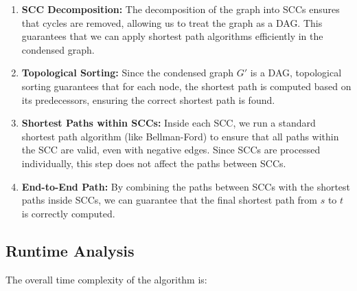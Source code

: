 \documentclass[11pt]{article}
\begin{document}
\begin{enumerate}
    \item \textbf{SCC Decomposition:} The decomposition of the graph into SCCs ensures that cycles are removed, allowing us to treat the graph as a DAG. This guarantees that we can apply shortest path algorithms efficiently in the condensed graph.
    
    \item \textbf{Topological Sorting:} Since the condensed graph \( G' \) is a DAG, topological sorting guarantees that for each node, the shortest path is computed based on its predecessors, ensuring the correct shortest path is found.
    
    \item \textbf{Shortest Paths within SCCs:} Inside each SCC, we run a standard shortest path algorithm (like Bellman-Ford) to ensure that all paths within the SCC are valid, even with negative edges. Since SCCs are processed individually, this step does not affect the paths between SCCs.
    
    \item \textbf{End-to-End Path:} By combining the paths between SCCs with the shortest paths inside SCCs, we can guarantee that the final shortest path from \( s \) to \( t \) is correctly computed.
\end{enumerate}

\subsection*{Runtime Analysis}

The overall time complexity of the algorithm is:
\end{document}
